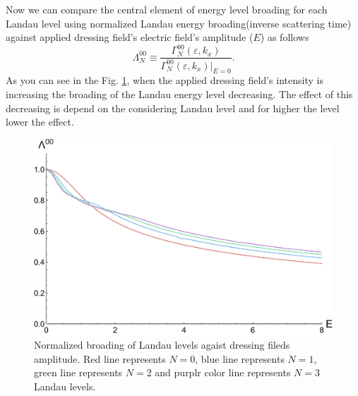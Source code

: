\noindent
Now we can compare the central element of energy level broading for each Landau level using normalized Landau energy broading(inverse scattering time) against applied dressing field's electric field's amplitude ($E$) as follows
\begin{equation} \label{6.8}
    \Lambda^{00}_{N} \equiv
    \frac{\Gamma^{00}_{N}(\varepsilon,k_x)}
    {\Gamma^{00}_{N}(\varepsilon,k_x)\big|_{E=0}}.
\end{equation}
As you can see in the Fig. \ref{fig6.1}, when the applied dressing field's intensity is increasing the broading of the Landau energy level decreasing. The effect of this decreasing is depend on the considering Landau level and for higher the level lower the effect.
\begin{figure}[ht!]
  \centering
  \includegraphics[scale=0.5]{figures/fig04.pdf}
  \caption{Normalized broading of Landau levels agaist dressing fileds amplitude. Red line represents $N=0$, blue line represents $N=1$, green line represents $N=2$ and purplr color line represents $N=3$ Landau levels.}
  \label{fig6.1}
\end{figure}

